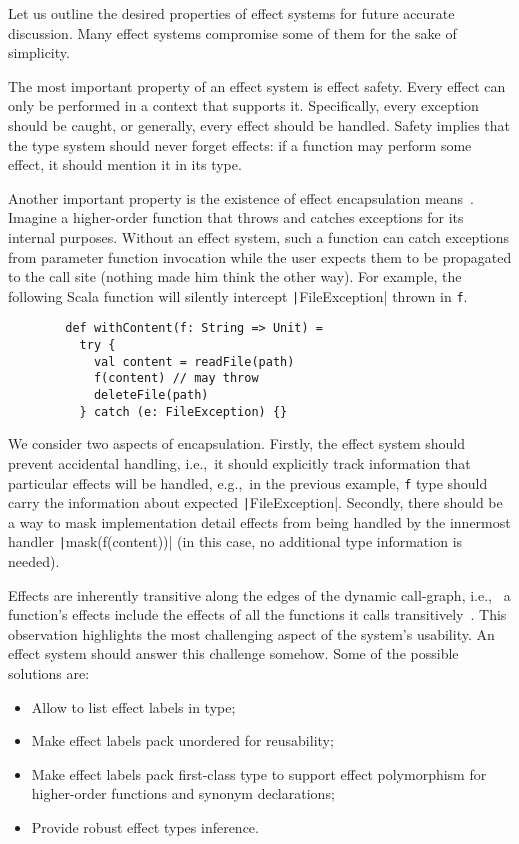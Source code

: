 \documentclass[conference]{IEEEtran}
\begin{document}
    Let us outline the desired properties of effect systems for future accurate discussion.
    Many effect systems compromise some of them for the sake of simplicity.

    The most important property of an effect system is effect safety.
    Every effect can only be performed in a context that supports it.
    Specifically, every exception should be caught, or generally, every effect should be handled.
    Safety implies that the type system should never forget effects: if a function may perform some effect, it should mention it in its type.

    Another important property is the existence of effect encapsulation means~\cite{lindley2018encapsulating}.
    Imagine a higher-order function that throws and catches exceptions for its internal purposes.
    Without an effect system, such a function can catch exceptions from parameter function invocation while the user expects them to be propagated to the call site (nothing made him think the other way).
    For example, the following Scala function will silently intercept \texttt|FileException| thrown in \texttt{f}.
    \begin{verbatim}
        def withContent(f: String => Unit) =
          try {
            val content = readFile(path)
            f(content) // may throw
            deleteFile(path)
          } catch (e: FileException) {}
    \end{verbatim}

    We consider two aspects of encapsulation.
    Firstly, the effect system should prevent accidental handling, i.e.,\ it should explicitly track information that particular effects will be handled, e.g.,\ in the previous example, \texttt{f} type should carry the information about expected \texttt|FileException|.
    Secondly, there should be a way to mask implementation detail effects from being handled by the innermost handler \texttt|mask(f(content))| (in this case, no additional type information is needed).

    Effects are inherently transitive along the edges of the dynamic call-graph, i.e., \ a function's effects include the effects of all the functions it calls transitively~\cite{odersky2022scoped}.
    This observation highlights the most challenging aspect of the system's usability.
    An effect system should answer this challenge somehow.
    Some of the possible solutions are:
    \begin{itemize}
        \item Allow to list effect labels in type;
        \item Make effect labels pack unordered for reusability;
        \item Make effect labels pack first-class type to support effect polymorphism for higher-order functions and synonym declarations;
        \item Provide robust effect types inference.
    \end{itemize}
\end{document}
